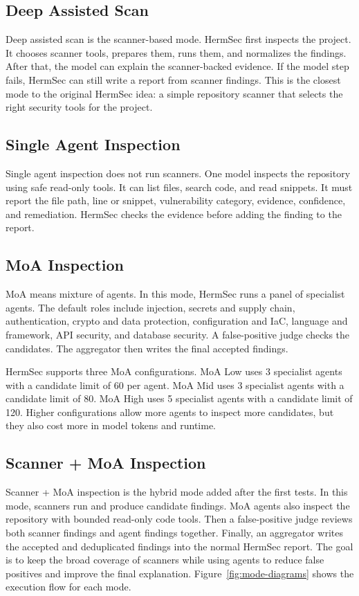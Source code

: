\documentclass[sigconf,nonacm]{acmart}
\begin{document}
\subsection{Deep Assisted Scan}
Deep assisted scan is the scanner-based mode. HermSec first inspects the project. It chooses scanner tools, prepares them, runs them, and normalizes the findings. After that, the model can explain the scanner-backed evidence. If the model step fails, HermSec can still write a report from scanner findings. This is the closest mode to the original HermSec idea: a simple repository scanner that selects the right security tools for the project.

\subsection{Single Agent Inspection}
Single agent inspection does not run scanners. One model inspects the repository using safe read-only tools. It can list files, search code, and read snippets. It must report the file path, line or snippet, vulnerability category, evidence, confidence, and remediation. HermSec checks the evidence before adding the finding to the report.

\subsection{MoA Inspection}
MoA means mixture of agents. In this mode, HermSec runs a panel of specialist agents. The default roles include injection, secrets and supply chain, authentication, crypto and data protection, configuration and IaC, language and framework, API security, and database security. A false-positive judge checks the candidates. The aggregator then writes the final accepted findings.

HermSec supports three MoA configurations. MoA Low uses 3 specialist agents with a candidate limit of 60 per agent. MoA Mid uses 3 specialist agents with a candidate limit of 80. MoA High uses 5 specialist agents with a candidate limit of 120. Higher configurations allow more agents to inspect more candidates, but they also cost more in model tokens and runtime.

\subsection{Scanner + MoA Inspection}
Scanner + MoA inspection is the hybrid mode added after the first tests. In this mode, scanners run and produce candidate findings. MoA agents also inspect the repository with bounded read-only code tools. Then a false-positive judge reviews both scanner findings and agent findings together. Finally, an aggregator writes the accepted and deduplicated findings into the normal HermSec report. The goal is to keep the broad coverage of scanners while using agents to reduce false positives and improve the final explanation. Figure~\ref{fig:mode-diagrams} shows the execution flow for each mode.
\end{document}

